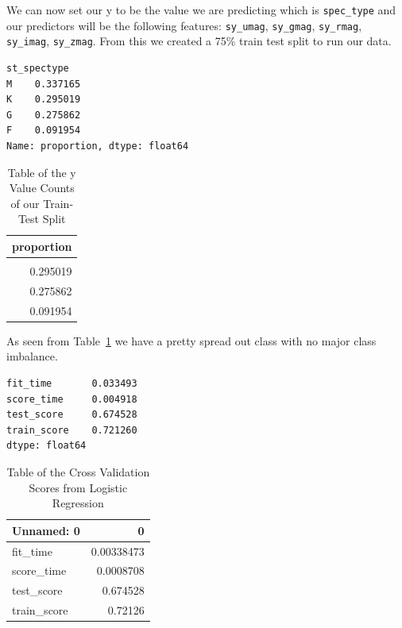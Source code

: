 \documentclass[
  letterpaper,
  DIV=11,
  numbers=noendperiod]{scrartcl}
\begin{document}
We can now set our y to be the value we are predicting which is
\texttt{spec\_type} and our predictors will be the following features:
\texttt{sy\_umag}, \texttt{sy\_gmag}, \texttt{sy\_rmag},
\texttt{sy\_imag}, \texttt{sy\_zmag}. From this we created a 75\% train
test split to run our data.

\begin{verbatim}
st_spectype
M    0.337165
K    0.295019
G    0.275862
F    0.091954
Name: proportion, dtype: float64
\end{verbatim}

\begin{longtable}[]{@{}r@{}}

\caption{\label{tbl-y-train-test-values}Table of the y Value Counts of
our Train-Test Split}

\tabularnewline

\toprule\noalign{}
proportion \\
\midrule\noalign{}
\endhead
\bottomrule\noalign{}
\endlastfoot
0.337165 \\
0.295019 \\
0.275862 \\
0.091954 \\

\end{longtable}

As seen from Table~\ref{tbl-y-train-test-values} we have a pretty spread
out class with no major class imbalance.

\begin{verbatim}
fit_time       0.033493
score_time     0.004918
test_score     0.674528
train_score    0.721260
dtype: float64
\end{verbatim}

\begin{longtable}[]{@{}lr@{}}

\caption{\label{tbl-lr-cross\_validate}Table of the Cross Validation
Scores from Logistic Regression}

\tabularnewline

\toprule\noalign{}
Unnamed: 0 & 0 \\
\midrule\noalign{}
\endhead
\bottomrule\noalign{}
\endlastfoot
fit\_time & 0.00338473 \\
score\_time & 0.0008708 \\
test\_score & 0.674528 \\
train\_score & 0.72126 \\

\end{longtable}
\end{document}
